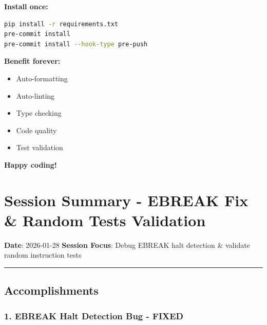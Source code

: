 \begin{record}

\textbf{Install once:}

\begin{lstlisting}[language=bash]
pip install -r requirements.txt
pre-commit install
pre-commit install --hook-type pre-push
\end{lstlisting}

\textbf{Benefit forever:}

\begin{itemize}
\tightlist
\item
  Auto-formatting
\item
  Auto-linting
\item
  Type checking
\item
  Code quality
\item
  Test validation
\end{itemize}

\textbf{Happy coding!} \notemark{}

\end{record}

\section{Session Summary - EBREAK Fix \& Random Tests Validation}\label{cr:app:archive-session-summary}

\begin{record}

\textbf{Date}: 2026-01-28 \textbf{Session Focus}: Debug EBREAK halt
detection \& validate random instruction tests

\begin{center}\rule{0.5\linewidth}{0.5pt}\end{center}

\end{record}

\subsection{Accomplishments}\label{cr:app:archive-session-summary:accomplishments}

\subsubsection{\texorpdfstring{1. \ok{} EBREAK Halt Detection Bug -
FIXED}{1.  EBREAK Halt Detection Bug - FIXED}}\label{cr:app:archive-session-summary:1-white-check-mark-ebreak-halt-detection-bug-fixed}

